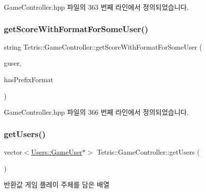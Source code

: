 Game\+Controller.\+hpp 파일의 363 번째 라인에서 정의되었습니다.

\mbox{\label{class_tetris_1_1_game_controller_ab9ee25a033698516dd98c254ab8f8f1b}} 
\subsubsection{\texorpdfstring{get\+Score\+With\+Format\+For\+Some\+User()}{getScoreWithFormatForSomeUser()}}
{\footnotesize\ttfamily string Tetris\+::\+Game\+Controller\+::get\+Score\+With\+Format\+For\+Some\+User (\begin{DoxyParamCaption}\item[{\hyperlink{class_tetris_1_1_users_1_1_game_user}{Game\+User} $\ast$}]{guser,  }\item[{bool}]{has\+Prefix\+Format }\end{DoxyParamCaption})\hspace{0.3cm}{\ttfamily [inline]}}



Game\+Controller.\+hpp 파일의 366 번째 라인에서 정의되었습니다.

\mbox{\label{class_tetris_1_1_game_controller_aa3c2d1f1b5539576116833526478355a}} 
\subsubsection{\texorpdfstring{get\+Users()}{getUsers()}}
{\footnotesize\ttfamily vector$<$\hyperlink{class_tetris_1_1_users_1_1_game_user}{Users\+::\+Game\+User}$\ast$$>$ Tetris\+::\+Game\+Controller\+::get\+Users (\begin{DoxyParamCaption}{ }\end{DoxyParamCaption})\hspace{0.3cm}{\ttfamily [inline]}}

\begin{DoxyReturn}{반환값}
게임 플레이 주체를 담은 배열 
\end{DoxyReturn}


